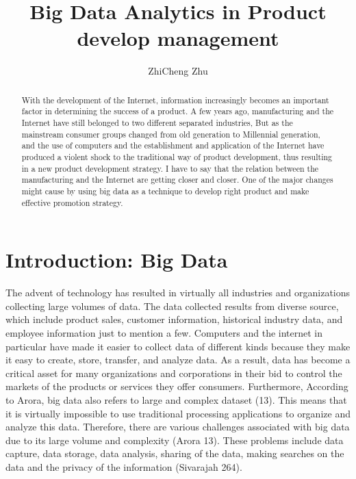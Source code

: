 \documentclass[sigconf]{acmart}
\begin{document}
\title{Big Data Analytics in Product develop management}


\author{ZhiCheng Zhu}


\begin{abstract}

    With the development of the Internet, information increasingly becomes an important factor in determining the success of a product. A few years ago, manufacturing and the Internet have still belonged to two different separated industries, But as the mainstream consumer groups changed from old generation to Millennial generation, and the use of computers and the establishment and application of the Internet have produced a violent shock to the traditional way of product development, thus resulting in a new product development strategy. I have to say that the relation between the manufacturing and the Internet are getting closer and closer. One of the major changes might cause by using big data as a technique to develop right product and make effective promotion strategy.
    
\end{abstract}


\maketitle

\section{Introduction: Big Data}
The advent of technology has resulted in virtually all industries and organizations collecting large volumes of data. The data collected results from diverse source, which include product sales, customer information, historical industry data, and employee information just to mention a few. Computers and the internet in particular have made it easier to collect data of different kinds because they make it easy to create, store, transfer, and analyze data. As a result, data has become a critical asset for many organizations and corporations in their bid to control the markets of the products or services they offer consumers. Furthermore, According to Arora, big data also refers to large and complex dataset (13). This means that it is virtually impossible to use traditional processing applications to organize and analyze this data. Therefore, there are various challenges associated with big data due to its large volume and complexity (Arora 13). These problems include data capture, data storage, data analysis, sharing of the data, making searches on the data and the privacy of the information (Sivarajah 264).
\end{document}
